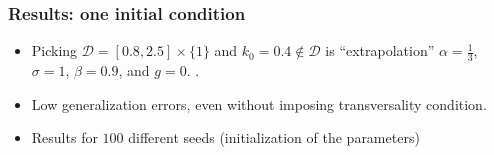 \documentclass[aspectratio=169,10pt]{beamer}
\begin{document}
\begin{frame}[label = res-rec]
	\frametitle{Results: one initial condition}
	\begin{minipage}[t]{0.4\textwidth}
	\end{minipage}
	\hfill%
	\begin{minipage}[t]{0.5\textwidth}\raggedleft
		\begin{itemize}
			\item Picking $\mathcal{D} =[0.8,2.5]\times \{1\}$ and $k_0= 0.4 \not\in \mathcal{D}$ is ``extrapolation''  $\alpha=\frac{1}{3}$, $\sigma =1$, $\beta = 0.9$, and $g = 0$.
			\smallskip.
			\item Low generalization errors, even without imposing transversality condition.
			\item Results for $100$ different seeds (initialization of the parameters)
		\end{itemize}
		\hyperlink{rec-all-over-space}{}		
	\end{minipage}
\end{frame}
\end{document}
